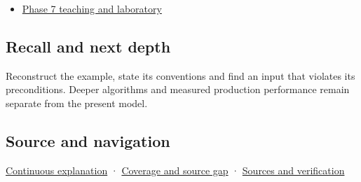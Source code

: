 \begin{itemize}
\tightlist
\item
  \hyperref[01-foundations-i-ch018-keep-the-promises-visible-while-moving-between-representations]{Phase 7 teaching and laboratory}
\end{itemize}

\subsection{Recall and next depth}\label{appendix-292c061cd47c-recall-and-next-depth}

Reconstruct the example, state its conventions and find an input that violates its preconditions. Deeper algorithms and measured production performance remain separate from the present model.

\subsection{Source and navigation}\label{appendix-292c061cd47c-source-and-navigation}

\hyperref[01-foundations-i-ch018-keep-the-promises-visible-while-moving-between-representations]{Continuous explanation} · \hyperref[appendix-fd090d982a15-phase-7---parts-601-700]{Coverage and source gap} · \hyperref[appendix-a103e7846d21-phase-7---source-analysis-and-verification]{Sources and verification}
